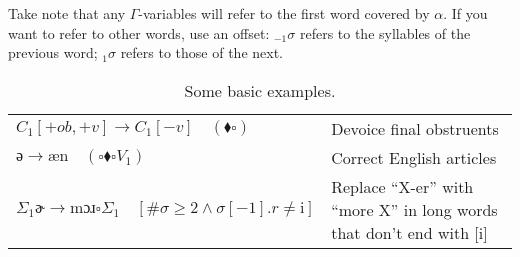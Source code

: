 \documentclass{book}
\begin{document}
Take note that any $\Gamma$-variables will refer to the first word covered by $\alpha$. If you want to refer to other words, use an offset: $_{-1}\sigma$ refers to the syllables of the previous word; $_1\sigma$ refers to those of the next.

\begin{table}[h]
  \caption{Some basic examples.}
  \centering
  \begin{tabu} to \linewidth {|l|X|}
    \hline
    $C_1[+ob,+v] \rightarrow C_1[-v] \quad(\blacklozenge \square)$ & Devoice final obstruents \\
    $\text{ə} \rightarrow \text{æn} \quad(\square \blacklozenge \square V_1)$ & Correct English articles \\
    $\Sigma_1 \text{ɚ} \rightarrow \text{mɔɹ} \square \Sigma_1 \quad[\#\sigma \ge 2 \land \sigma[-1].r \ne \text{i}]$ & Replace ``X-er'' with ``more X'' in long words that don't end with [i] \\
    \hline
  \end{tabu}
\end{table}
\end{document}
